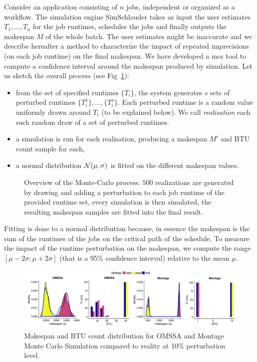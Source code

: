 \documentclass[10pt,conference,compsocconf]{IEEEtran}
\begin{document}
Consider an  application consisting of  $n$ jobs,  independent or organized  as a
workflow.  The simulation engine SimSchlouder  takes as input the user estimates
$T_1, \ldots , T_n$ for the job runtimes, schedules the jobs and finally outputs
the makespan $M$ of the whole batch.  The user estimates might be inaccurate
and  we describe  hereafter  a method  to characterize  the  impact of  repeated
imprecisions (on each  job runtime) on the final makespan.   We have developed a
\ac{mcs} tool to  compute a confidence interval around the  makespan produced by
simulation.  Let us sketch the overall process (see Fig~\ref{fig:mc-process}):
\begin{itemize} 
\item from  the set of  specified runtimes  $\{T_i\}$, the system  generates $s$
  sets  of perturbed  runtimes $\{T_i^1\},  \ldots, \{T_i^s\}$.   Each perturbed
  runtime  is a  random  value  uniformly drawn  around  $T_i$  (to be explained
  below). We call \emph{realisation} each such random draw of a set of perturbed
  runtimes.
\item a simulation  is run for each realisation, producing  a makespan $M^i$ and
  BTU count sample for each,
\item a  normal distribution ${\cal  N}(\mu,\sigma)$ is fitted on  the different
  makespan values.
\end{itemize}
\begin{figure}
	\centering
	\resizebox{0.5\textwidth}{!}{%
		
		}
\caption{Overview of the Monte-Carlo process: $500$ realizations are generated
by drawing and adding a perturbation to each job runtime of the provided
runtime set, every simulation is then simulated, the resulting makespan
samples are fitted into the final result.}\label{fig:mc-process}
\end{figure}
Fitting is done to a normal distribution because, in essence the makespan is the
sum  of the  runtimes of  the jobs  on the  critical path  of the  schedule.  To
measure the impact  of the runtime perturbation on the  makespan, we compute the
range $[\mu-2\sigma;\mu+2\sigma]$ (that is  a 95\% confidence interval) relative
to  the mean  $\mu$. 

\begin{figure}
	\includegraphics[width=\textwidth]{gfx/fit_plot.pdf}
	\caption{Makespan and BTU count distribution for OMSSA and Montage Monte
	Carlo Simulation compared to reality at 10\% perturbation
	level.}\label{fig:fit}
\end{figure}
\end{document}
